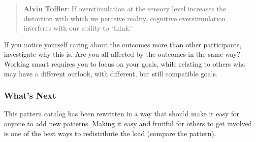 \begin{quote}
\textbf{Alvin Toffler}: If overstimulation at the sensory level
increases the distortion with which we perceive reality, cognitive
overstimulation interferes with our ability to `think.'
\end{quote}

If you notice yourself caring about the outcomes more than other
participants, investigate why this is. Are you all affected by the
outcomes in the same way? Working smart requires you to focus on your
goals, while relating to others who may have a different outlook, with
different, but still compatible goals.

\subsubsection*{What's Next} This pattern catalog has been rewritten in a way
that should make it easy for anyone to add new patterns. Making it easy
and fruitful for others to get involved is one of the best ways to
redistribute the load (compare
the 
pattern).


